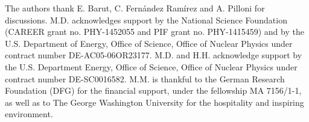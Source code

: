 \documentclass[10pt,aps,prc,superscriptaddress,twoside,twocolumn,nofootinbib,showpacs,preprintnumbers]{revtex4-1}
\begin{document}
\begin{acknowledgments}
The authors thank E. Barut, C. Fern\'andez Ram\'irez and A. Pilloni for discussions.
M.D. acknowledges support by the National Science Foundation (CAREER grant no. PHY-1452055 and PIF grant no. PHY-1415459) and by the U.S. Department of Energy, Office of Science, Office of Nuclear Physics under contract number DE-AC05-06OR23177. M.D. and H.H. acknowledge support by the U.S. Department  Energy, Office of Science, Office of Nuclear Physics under contract number DE-SC0016582.  M.M. is thankful to the German Research Foundation (DFG) for the financial support, under the fellowship MA 7156/1-1, as well as to The George Washington University for the hospitality and inspiring environment.
\end{acknowledgments}

\appendix
\end{document}
